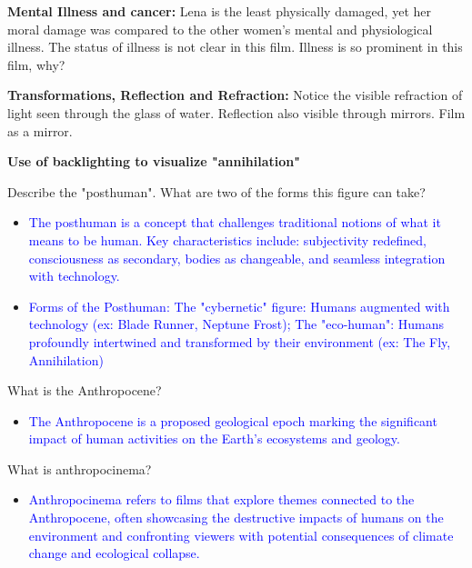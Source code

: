 \documentclass[11pt,fleqn]{book}
\begin{document}
\textbf{Mental Illness and cancer: }Lena is the least physically damaged, yet her moral damage was compared to the other women's mental and physiological illness. The status of illness is not clear in this film. Illness is so prominent in this film, why?

\textbf{Transformations, Reflection and Refraction: }Notice the visible refraction of light seen through the glass of water. Reflection also visible through mirrors. Film as a mirror.

\textbf{Use of backlighting to visualize "annihilation"}

\begin{exercise}
Describe the "posthuman". What are two of the forms this figure can take?
\begin{itemize}
\item \textcolor{blue}{The posthuman is a concept that challenges traditional notions of what it means to be human. Key characteristics include: subjectivity redefined,  consciousness as secondary, bodies as changeable, and seamless integration with technology.}
\item \textcolor{blue}{Forms of the Posthuman: The "cybernetic" figure: Humans augmented with technology (ex: Blade Runner, Neptune Frost); The "eco-human":  Humans profoundly intertwined and transformed by their environment  (ex:  The Fly,  Annihilation)}
\end{itemize}
\end{exercise}

\begin{exercise}
What is the Anthropocene?
\begin{itemize}
\item \textcolor{blue}{The Anthropocene is a proposed geological epoch marking the significant impact of human activities on the Earth's ecosystems and geology.}
\end{itemize}
\end{exercise}

\begin{exercise}
What is anthropocinema?
\begin{itemize}
\item \textcolor{blue}{Anthropocinema refers to films that explore themes connected to the Anthropocene, often showcasing the destructive impacts of humans on the environment and confronting viewers with potential consequences of  climate change and ecological collapse.}
\end{itemize}
\end{exercise}
\end{document}
